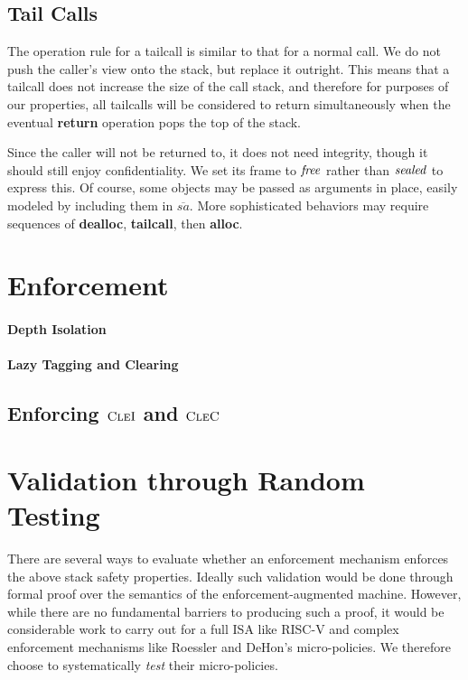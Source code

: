 \documentclass[10pt,conference]{ieeetran}%
\theoremstyle{definition}
\begin{document}
\subsection{Tail Calls}

The operation rule for a tailcall is similar to that for a normal call.
We do not push the caller's view onto the stack,
but replace it outright. This means that a tailcall does not increase the size of
the call stack, and therefore for purposes of our properties, all tailcalls will
be considered to return simultaneously when the eventual {\bf return} operation
pops the top of the stack.

Since the caller will not be returned to, it does not need integrity, though
it should still enjoy confidentiality. We set its frame to \(\mathit{free}\) rather
than \(\mathit{sealed}\) to express this. Of course, some objects may be passed as arguments
in place, easily modeled by including them in \(\overline{sa}\). More sophisticated
behaviors may require sequences of {\bf dealloc}, {\bf tailcall}, then {\bf alloc}.

\section{Enforcement}


\paragraph{Depth Isolation}

\paragraph{Lazy Tagging and Clearing}

\subsection{Enforcing \(\textnormal{\sc CleI}\) and \(\textnormal{\sc CleC}\)}

\section{Validation through Random Testing}
\label{sec:testing}

There are several ways to evaluate whether an enforcement mechanism enforces the above
stack safety properties. Ideally such validation would be done through formal proof over
the semantics of the enforcement-augmented machine.
However, while there are no fundamental barriers to producing such a proof,
it would be considerable work to carry out for a full ISA like RISC-V and
complex enforcement mechanisms like Roessler and DeHon's micro-policies.
We therefore choose to systematically \emph{test} their micro-policies.
\end{document}
